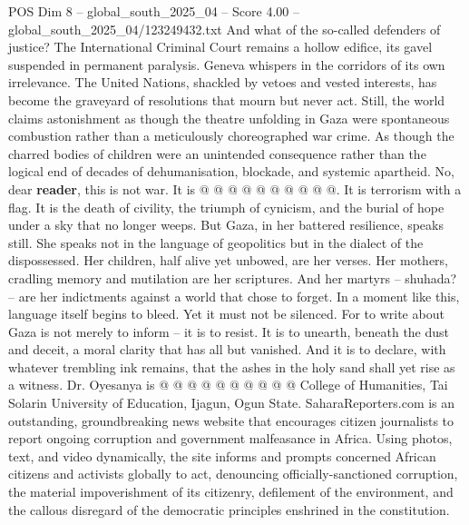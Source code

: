 \begin{textsample}{POS Dim 8 – global\_south\_2025\_04 – Score 4.00 – global\_south\_2025\_04/123249432.txt}
And what of the so-called defenders of justice?
The International Criminal Court remains a hollow edifice, its gavel suspended in permanent paralysis.
Geneva whispers in the corridors of its own irrelevance.
The United Nations, shackled by vetoes and vested interests, has become the graveyard of resolutions that mourn but never act.
Still, the world claims astonishment as though the theatre unfolding in Gaza were spontaneous combustion rather than a meticulously choreographed war crime.
As though the charred bodies of children were an unintended consequence rather than the logical end of decades of dehumanisation, blockade, and systemic apartheid.
No, dear \textbf{reader}, this is not war.
It is @ @ @ @ @ @ @ @ @ @.
It is terrorism with a flag.
It is the death of civility, the triumph of cynicism, and the burial of hope under a sky that no longer weeps.
But Gaza, in her battered resilience, speaks still.
She speaks not in the language of geopolitics but in the dialect of the dispossessed.
Her children, half alive yet unbowed, are her verses.
Her mothers, cradling memory and mutilation are her scriptures.
And her martyrs -- shuhada? -- are her indictments against a world that chose to forget.
In a moment like this, language itself begins to bleed.
Yet it must not be silenced.
For to write about Gaza is not merely to inform -- it is to resist.
It is to unearth, beneath the dust and deceit, a moral clarity that has all but vanished.
And it is to declare, with whatever trembling ink remains, that the ashes in the holy sand shall yet rise as a witness.
Dr.
Oyesanya is @ @ @ @ @ @ @ @ @ @ College of Humanities, Tai Solarin University of Education, Ijagun, Ogun State.
SaharaReporters.com is an outstanding, groundbreaking news website that encourages citizen journalists to report ongoing corruption and government malfeasance in Africa.
Using photos, text, and video dynamically, the site informs and prompts concerned African citizens and activists globally to act, denouncing officially-sanctioned corruption, the material impoverishment of its citizenry, defilement of the environment, and the callous disregard of the democratic principles enshrined in the constitution.

\end{textsample}
